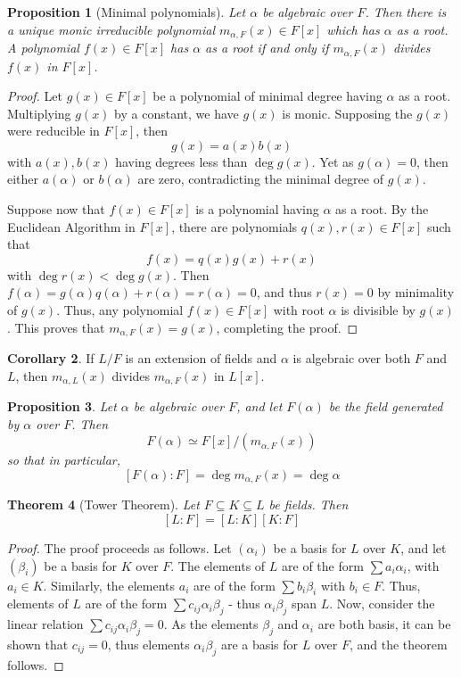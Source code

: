 \documentclass[10pt, oneside, reqno]{amsart}
\theoremstyle{plain}%
\newtheorem{thm}{Theorem}[section]
\newtheorem{prop}[thm]{Proposition}
\theoremstyle{definition}
\newtheorem{cor}[thm]{Corollary}
\theoremstyle{remark}
\newcommand{\al}{\alpha}
\newcommand{\xdeg}[2]{[#1 : #2]}
\newcommand{\minpoly}[2]{m_{#1, #2}(x)}
\begin{document}
\begin{prop}[Minimal polynomials]
    Let $\alpha$ be algebraic over $F$.  Then there is a unique monic irreducible polynomial $\minpoly{\alpha}{F} \in F[x]$ which has $\alpha$ as a root. A polynomial $f(x) \in F[x]$ has $\al$ as a root if and only if $\minpoly{\al}{F}$ divides $f(x)$ in $F[x]$.
\end{prop}
\begin{proof}
    Let $g(x) \in F[x]$ be a polynomial of minimal degree having $\alpha$ as a root.  Multiplying $g(x)$ by a constant, we have $g(x)$ is monic.  Supposing the $g(x)$ were reducible in $F[x]$, then \[
        g(x) = a(x)b(x)
    \] with $a(x), b(x)$ having degrees less than $\deg g(x)$.  Yet as $g(\alpha) = 0$, then either $a(\al)$ or $b(\al)$ are zero, contradicting the minimal degree of $g(x)$.
    
    Suppose now that $f(x) \in F[x]$ is a polynomial having $\al$ as a root.  By the Euclidean Algorithm in $F[x]$, there are polynomials $q(x), r(x) \in F[x]$ such that \[
        f(x) = q(x) g(x) + r(x)
    \] with $\deg r(x) < \deg g(x)$.  Then $f(\al) = g(\al) q(\al) + r(\al) = r(\al) = 0$, and thus $r(x) = 0$ by minimality of $g(x)$.  Thus, any polynomial $f(x) \in F[x]$ with root $\al$ is divisible by $g(x)$.  
    This proves that $\minpoly{\alpha}{F} = g(x)$, completing the proof.
\end{proof}

\begin{cor}
    If $L/F$ is an extension of fields and $\al$ is algebraic over both $F$ and $L$, then $\minpoly{\al}{L}$ divides $\minpoly{\al}{F}$ in $L[x]$.
\end{cor}

\begin{prop}
    Let $\al$ be algebraic over $F$, and let $F(\al)$ be the field generated by $\al$ over $F$. Then\[
        F(\al) \simeq F[x]/(\minpoly{\al}{F})
    \]
    so that in particular,\[
        \xdeg{F(\al)}{F} = \deg \minpoly{\al}{F} = \deg \al
    \]
\end{prop}

\begin{thm}[Tower Theorem]
    Let $F \subseteq K \subseteq L$ be fields. Then\[
        \xdeg{L}{F} = \xdeg{L}{K} \xdeg{K}{F}
    \]
\end{thm}
\begin{proof}
    The proof proceeds as follows.  Let $(\alpha_i)$ be a basis for $L$ over $K$, and let $(\beta_i)$ be a basis for $K$ over $F$. The elements of $L$ are of the form $\sum a_i \alpha_i$, with $a_i \in K$.  Similarly, the elements $a_i$ are of the form $\sum b_i \beta_i$ with $b_i \in F$.  Thus, elements of $L$ are of the form $\sum c_{ij} \alpha_i \beta_j$ - thus $\alpha_i \beta_j$ span $L$.  Now, consider the linear relation $\sum c_{ij} \al_i \beta_j = 0$.  As the elements $\beta_j$ and $\alpha_i$ are both basis, it can be shown that $c_{ij} = 0$, thus elements $\alpha_i \beta_j$ are a basis for $L$ over $F$, and the theorem follows.
\end{proof}
\end{document}
